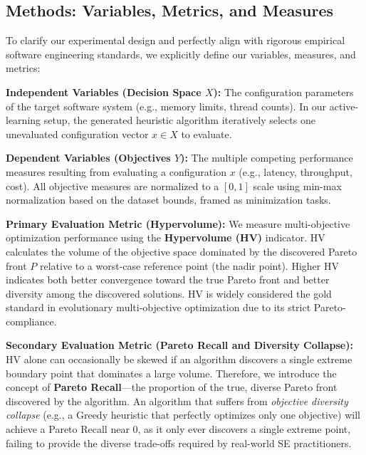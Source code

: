 \documentclass[sigconf,nonacm]{acmart}
\begin{document}
\subsection{Methods: Variables, Metrics, and Measures}

To clarify our experimental design and perfectly align with rigorous empirical software engineering standards, we explicitly define our variables, measures, and metrics:

\textbf{Independent Variables (Decision Space $X$):} The configuration parameters of the target software system (e.g., memory limits, thread counts). In our active-learning setup, the generated heuristic algorithm iteratively selects one unevaluated configuration vector $x \in X$ to evaluate.

\textbf{Dependent Variables (Objectives $Y$):} The multiple competing performance measures resulting from evaluating a configuration $x$ (e.g., latency, throughput, cost). All objective measures are normalized to a $[0, 1]$ scale using min-max normalization based on the dataset bounds, framed as minimization tasks.

\textbf{Primary Evaluation Metric (Hypervolume):} We measure multi-objective optimization performance using the \textbf{Hypervolume (HV)} indicator. HV calculates the volume of the objective space dominated by the discovered Pareto front $P$ relative to a worst-case reference point (the nadir point). Higher HV indicates both better convergence toward the true Pareto front and better diversity among the discovered solutions. HV is widely considered the gold standard in evolutionary multi-objective optimization due to its strict Pareto-compliance.

\textbf{Secondary Evaluation Metric (Pareto Recall and Diversity Collapse):} HV alone can occasionally be skewed if an algorithm discovers a single extreme boundary point that dominates a large volume. Therefore, we introduce the concept of \textbf{Pareto Recall}---the proportion of the true, diverse Pareto front discovered by the algorithm. An algorithm that suffers from \emph{objective diversity collapse} (e.g., a Greedy heuristic that perfectly optimizes only one objective) will achieve a Pareto Recall near $0$, as it only ever discovers a single extreme point, failing to provide the diverse trade-offs required by real-world SE practitioners.
\end{document}
